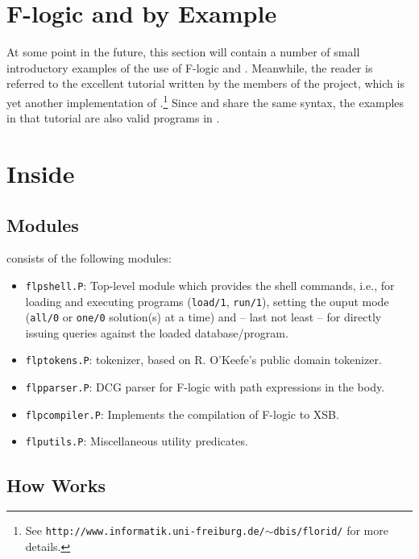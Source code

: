 \section{F-logic and \FLIP by Example}

At some point in the future, this section will contain a number of small
introductory examples of the use of F-logic and \FLIP. Meanwhile, the
reader is referred to the excellent tutorial written by the members of the
\FLORID project, which is yet another implementation of \fl.\footnote{
  See {\tt http://www.informatik.uni-freiburg.de/$\sim$dbis/florid/} for more
  details.
  }
Since \FLIP
and \FLORID share the same syntax, the examples in that tutorial are
also valid programs in \FLIP.



\section{Inside \FLIP}


\subsection{Modules}

\FLIP consists of the following modules:
\begin{itemize}
\item \texttt{flpshell.P}: Top-level module which provides the \FLIP shell
  commands, i.e., for loading and executing \FLIP programs
  (\texttt{load/1}, \texttt{run/1}), setting the ouput mode
  (\texttt{all/0} or \texttt{one/0} solution(s) at a time) and -- last
  not least -- for directly issuing queries against the loaded
  database/program.
\item \texttt{flptokens.P}: \FLIP tokenizer, based on R. O'Keefe's public
  domain tokenizer.
\item \texttt{flpparser.P}: DCG parser for F-logic with path expressions
  in the body.
\item \texttt{flpcompiler.P}: Implements the compilation of F-logic to
  XSB.
\item \texttt{flputils.P}: Miscellaneous utility predicates.
\end{itemize}



\subsection{How \FLIP Works}



